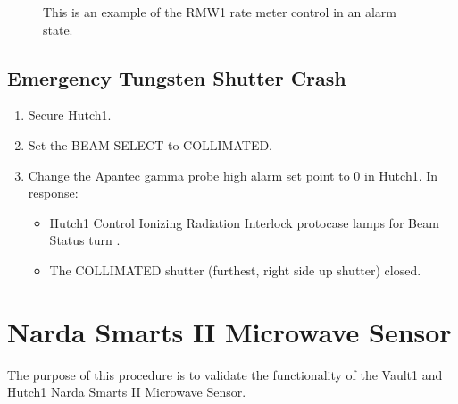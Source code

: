 \documentclass[letterpaper,10pt,english]{sphinxmanual}
\begin{document}
\begin{figure}[htbp]
\centering
\capstart

\noindent{}
\caption{ This is an example of the RMW1 rate meter control in an alarm state.}\label{\detokenize{testing_documentation/apantec_testing:id5}}\end{figure}


\subsection{Emergency Tungsten Shutter Crash}
\label{\detokenize{testing_documentation/apantec_testing:emergency-tungsten-shutter-crash}}\begin{enumerate}
%
\item {} 
\sphinxAtStartPar
Secure Hutch\sphinxhyphen{}1.

\item {} 
\sphinxAtStartPar
Set the BEAM SELECT to COLLIMATED.

\item {} 
\sphinxAtStartPar
Change the Apantec gamma probe high alarm set point to 0 in Hutch\sphinxhyphen{}1.
In response:
\begin{itemize}
\item {} 
\sphinxAtStartPar
Hutch\sphinxhyphen{}1 Control Ionizing Radiation Interlock protocase lamps for Beam Status turn .

\item {} 
\sphinxAtStartPar
The COLLIMATED shutter (furthest, right side up shutter) closed.

\end{itemize}

\end{enumerate}

\sphinxstepscope


\section{Narda Smarts II Microwave Sensor}
\label{\detokenize{testing_documentation/narda_testing:narda-smarts-ii-microwave-sensor}}\label{\detokenize{testing_documentation/narda_testing::doc}}
\sphinxAtStartPar
The purpose of this procedure is to validate the functionality of the Vault\sphinxhyphen{}1 and Hutch\sphinxhyphen{}1 Narda Smarts II Microwave Sensor.
\end{document}
